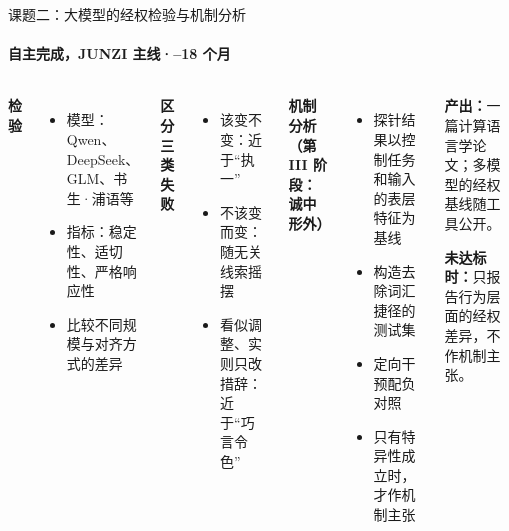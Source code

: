 \documentclass[aspectratio=169,11pt,fontset=fandol]{ctexbeamer}
\newcommand{\hg}[1]{{\bfseries\color{golddeep}#1}}       %
\begin{document}
\begin{frame}[t]{课题二：大模型的经权检验与机制分析}
\framesubtitle{自主完成，JUNZI 主线\quad·–18 个月}
\vspace{2pt}
\begin{columns}[T,onlytextwidth]
{\hg{检验}}
\begin{itemize}\small\setlength{\itemsep}{2pt}
\item 模型：Qwen、DeepSeek、GLM、书生·浦语等
\item 指标：稳定性、适切性、严格响应性
\item 比较不同规模与对齐方式的差异
\end{itemize}
\vspace{4pt}
{\hg{区分三类失败}}
\begin{itemize}\small\setlength{\itemsep}{2pt}
\item 该变不变：近于“执一”
\item 不该变而变：随无关线索摇摆
\item 看似调整、实则只改措辞：近于“巧言令色”
\end{itemize}
{\hg{机制分析（第 III 阶段：诚中形外）}}
\begin{itemize}\small\setlength{\itemsep}{2pt}
\item 探针结果以控制任务和输入的表层特征为基线
\item 构造去除词汇捷径的测试集
\item 定向干预配负对照
\item 只有特异性成立时，才作机制主张
\end{itemize}
\vspace{3pt}
\begin{thesis}
\small\textbf{产出：}一篇计算语言学论文；多模型的经权基线随工具公开。\par
\textbf{未达标时：}只报告行为层面的经权差异，不作机制主张。
\end{thesis}
\end{columns}
\end{frame}
\end{document}
